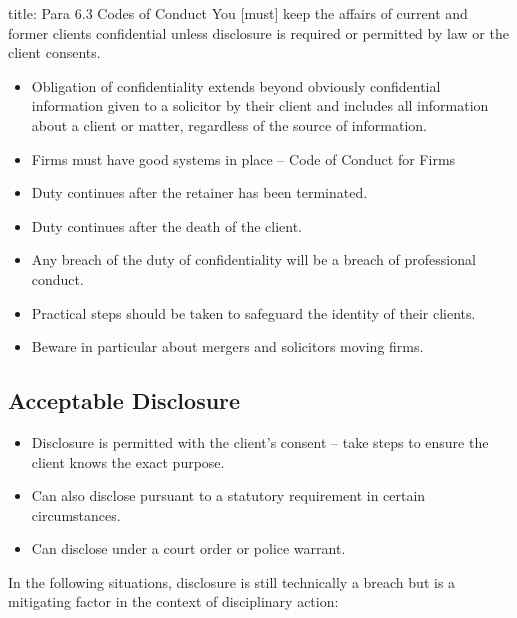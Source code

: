 \documentclass[
]{article}
\newenvironment{Shaded}{}{}
\newcommand{\NormalTok}[1]{#1}
\providecommand{\tightlist}{%
  \setlength{\itemsep}{0pt}\setlength{\parskip}{0pt}}
\begin{document}
\begin{Shaded}
\begin{Highlighting}[]
\NormalTok{title: Para 6.3 Codes of Conduct}
\NormalTok{You [must] keep the affairs of current and former clients confidential unless disclosure is required or permitted by law or the client consents. }
\end{Highlighting}
\end{Shaded}

\begin{itemize}
\tightlist
\item
  Obligation of confidentiality extends beyond obviously confidential
  information given to a solicitor by their client and includes all
  information about a client or matter, regardless of the source of
  information.
\item
  Firms must have good systems in place -- Code of Conduct for Firms
\item
  Duty continues after the retainer has been terminated.
\item
  Duty continues after the death of the client.
\item
  Any breach of the duty of confidentiality will be a breach of
  professional conduct.
\item
  Practical steps should be taken to safeguard the identity of their
  clients.
\item
  Beware in particular about mergers and solicitors moving firms.
\end{itemize}

\hypertarget{acceptable-disclosure}{%
\subsection{Acceptable Disclosure}\label{acceptable-disclosure}}

\begin{itemize}
\tightlist
\item
  Disclosure is permitted with the client's consent -- take steps to
  ensure the client knows the exact purpose.
\item
  Can also disclose pursuant to a statutory requirement in certain
  circumstances.
\item
  Can disclose under a court order or police warrant.
\end{itemize}

In the following situations, disclosure is still technically a breach
but is a mitigating factor in the context of disciplinary action:
\end{document}
